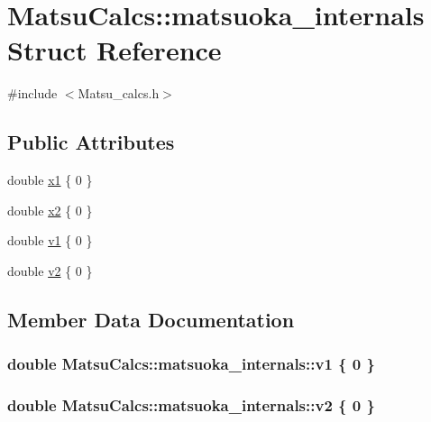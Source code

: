 \hypertarget{structMatsuCalcs_1_1matsuoka__internals}{}\section{Matsu\+Calcs\+:\+:matsuoka\+\_\+internals Struct Reference}
\label{structMatsuCalcs_1_1matsuoka__internals}


{\ttfamily \#include $<$Matsu\+\_\+calcs.\+h$>$}

\subsection*{Public Attributes}
\begin{DoxyCompactItemize}
\item 
double \hyperlink{structMatsuCalcs_1_1matsuoka__internals_a94e9d15c2de229653c4bf4542cf7df34}{x1} \{ 0 \}
\item 
double \hyperlink{structMatsuCalcs_1_1matsuoka__internals_a5e8455597562089dae55b3b6598433ad}{x2} \{ 0 \}
\item 
double \hyperlink{structMatsuCalcs_1_1matsuoka__internals_ad6827ca11352d648dd80a538bb063efe}{v1} \{ 0 \}
\item 
double \hyperlink{structMatsuCalcs_1_1matsuoka__internals_aa43dda881aa69f2803f37f431e621320}{v2} \{ 0 \}
\end{DoxyCompactItemize}


\subsection{Member Data Documentation}
\subsubsection[{\texorpdfstring{v1}{v1}}]{\setlength{\rightskip}{0pt plus 5cm}double Matsu\+Calcs\+::matsuoka\+\_\+internals\+::v1 \{ 0 \}}\hypertarget{structMatsuCalcs_1_1matsuoka__internals_ad6827ca11352d648dd80a538bb063efe}{}\label{structMatsuCalcs_1_1matsuoka__internals_ad6827ca11352d648dd80a538bb063efe}
\subsubsection[{\texorpdfstring{v2}{v2}}]{\setlength{\rightskip}{0pt plus 5cm}double Matsu\+Calcs\+::matsuoka\+\_\+internals\+::v2 \{ 0 \}}\hypertarget{structMatsuCalcs_1_1matsuoka__internals_aa43dda881aa69f2803f37f431e621320}{}\label{structMatsuCalcs_1_1matsuoka__internals_aa43dda881aa69f2803f37f431e621320}
